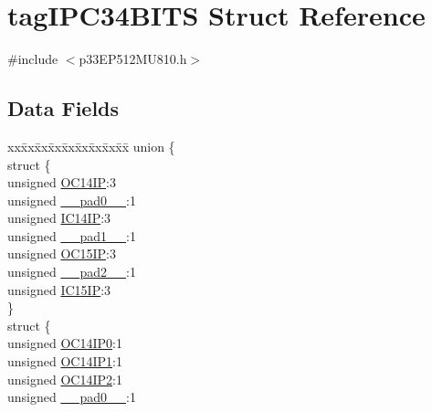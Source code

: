 \hypertarget{structtag_i_p_c34_b_i_t_s}{}\section{tag\+I\+P\+C34\+B\+I\+TS Struct Reference}
\label{structtag_i_p_c34_b_i_t_s}


{\ttfamily \#include $<$p33\+E\+P512\+M\+U810.\+h$>$}

\subsection*{Data Fields}
\begin{DoxyCompactItemize}
\item 
\begin{tabbing}
xx\=xx\=xx\=xx\=xx\=xx\=xx\=xx\=xx\=\kill
union \{\\
\>struct \{\\
\>\>unsigned \hyperlink{structtag_i_p_c34_b_i_t_s_a1305831c816933d2822af5d6b4a80af6}{OC14IP}:3\\
\>\>unsigned \hyperlink{structtag_i_p_c34_b_i_t_s_adf71f3d8410c1f1dbbc96680a92c49af}{\_\_pad0\_\_}:1\\
\>\>unsigned \hyperlink{structtag_i_p_c34_b_i_t_s_af13f30cc820dbf4efecf75bc1c0a158a}{IC14IP}:3\\
\>\>unsigned \hyperlink{structtag_i_p_c34_b_i_t_s_acaf2d0924a107ec6e8d2e31febaf66f9}{\_\_pad1\_\_}:1\\
\>\>unsigned \hyperlink{structtag_i_p_c34_b_i_t_s_af38ac2f71cb8deafe398ad8da37a03ec}{OC15IP}:3\\
\>\>unsigned \hyperlink{structtag_i_p_c34_b_i_t_s_a4d97cc5f7d51d22fc2bf3eab35c9cb7f}{\_\_pad2\_\_}:1\\
\>\>unsigned \hyperlink{structtag_i_p_c34_b_i_t_s_a3d6c9d27bc54c2ff7eb7f4377a01eeb7}{IC15IP}:3\\
\>\} \\
\>struct \{\\
\>\>unsigned \hyperlink{structtag_i_p_c34_b_i_t_s_a692ca38d0aabef9fc6db8a95f45d7aba}{OC14IP0}:1\\
\>\>unsigned \hyperlink{structtag_i_p_c34_b_i_t_s_a99866f1d7976b619877a287f19591c06}{OC14IP1}:1\\
\>\>unsigned \hyperlink{structtag_i_p_c34_b_i_t_s_ad7e9b0b87efbf7b8acf8eb91d8bd962a}{OC14IP2}:1\\
\>\>unsigned \hyperlink{structtag_i_p_c34_b_i_t_s_adf71f3d8410c1f1dbbc96680a92c49af}{\_\_pad0\_\_}:1\\

\end{tabbing}
\end{DoxyCompactItemize}
